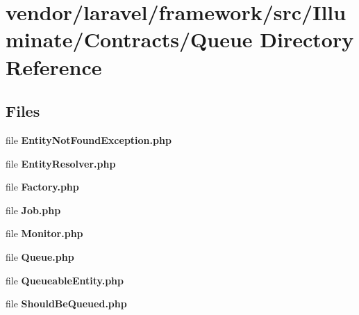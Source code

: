 \section{vendor/laravel/framework/src/\+Illuminate/\+Contracts/\+Queue Directory Reference}
\label{dir_3c85adfc534d1381fafe137ff9826b72}
\subsection*{Files}
\begin{DoxyCompactItemize}
\item 
file {\bf Entity\+Not\+Found\+Exception.\+php}
\item 
file {\bf Entity\+Resolver.\+php}
\item 
file {\bf Factory.\+php}
\item 
file {\bf Job.\+php}
\item 
file {\bf Monitor.\+php}
\item 
file {\bf Queue.\+php}
\item 
file {\bf Queueable\+Entity.\+php}
\item 
file {\bf Should\+Be\+Queued.\+php}
\end{DoxyCompactItemize}
